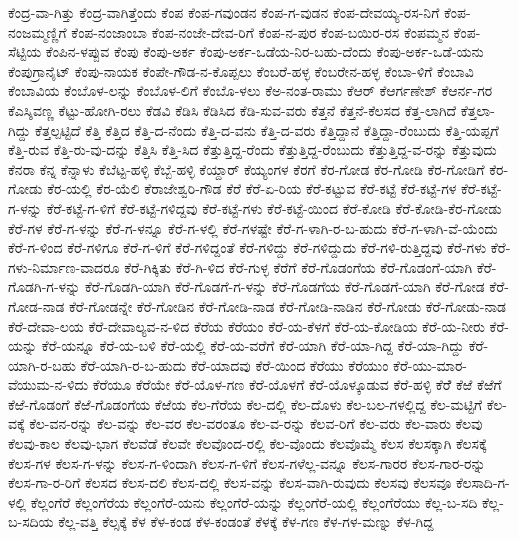 ಕೆಂದ್ರ-ವಾ-ಗಿತ್ತು
ಕೆಂದ್ರ-ವಾಗಿತ್ತೆಂದು
ಕೆಂಪ
ಕೆಂಪ-ಗವುಂಡನ
ಕೆಂಪ-ಗ-ವುಡನ
ಕೆಂಪ-ದೇವಯ್ಯ-ರಸ-ನಿಗೆ
ಕೆಂಪ-ನಂಜಮ್ಮಣ್ಣಿಗೆ
ಕೆಂಪ-ನಂಜಾಂಬಾ
ಕೆಂಪ-ನಂಜೇ-ದೇವ-ರಿಗೆ
ಕೆಂಪ-ನ-ಪುರ
ಕೆಂಪ-ಬಯಿರ-ರಸ
ಕೆಂಪಮ್ಮನ
ಕೆಂಪ-ಸೆಟ್ಟಿಯ
ಕೆಂಪಿನ-ಳಪ್ಪುವ
ಕೆಂಪು
ಕೆಂಪು-ಅರ್ಕ
ಕೆಂಪು-ಅರ್ಕ-ಒಡೆಯ-ನಿರ-ಬಹು-ದೆಂದು
ಕೆಂಪು-ಅರ್ಕ-ಒಡೆ-ಯನು
ಕೆಂಪುಗ್ರಾನೈಟ್
ಕೆಂಪು-ನಾಯಕ
ಕೆಂಪೇ-ಗೌಡ-ನ-ಕೊಪ್ಪಲು
ಕೆಂಬರೆ-ಹಳ್ಳ
ಕೆಂಬರೇನ-ಹಳ್ಳ
ಕೆಂಬಾ-ಳಿಗೆ
ಕೆಂಬಾವಿ
ಕೆಂಬಾವಿಯ
ಕೆಂಬೊಳ-ಲನ್ನು
ಕೆಂಬೊಳ-ಲಿಗೆ
ಕೆಂಬೊ-ಳಲು
ಕೆಅ-ನಂತ-ರಾಮು
ಕೆಆರ್
ಕೆಆರ್ಗಣೇಶ್
ಕೆಆರ್ನ-ಗರ
ಕೆಎಸ್ಶಿವಣ್ಣ
ಕೆಟ್ಟು-ಹೋಗಿ-ರಲು
ಕೆಡವಿ
ಕೆಡಿಸಿ
ಕೆಡಿಸಿದ
ಕೆಡಿ-ಸುವ-ವರು
ಕೆತ್ತನೆ
ಕೆತ್ತನೆ-ಕೆಲಸದ
ಕೆತ್ತ-ಲಾಗಿದೆ
ಕೆತ್ತಲಾ-ಗಿದ್ದು
ಕೆತ್ತಲ್ಪಟ್ಟಿದೆ
ಕೆತ್ತಿ
ಕೆತ್ತಿದ
ಕೆತ್ತಿ-ದ-ನೆಂದು
ಕೆತ್ತಿ-ದ-ವನು
ಕೆತ್ತಿ-ದ-ವರು
ಕೆತ್ತಿದ್ದಾನೆ
ಕೆತ್ತಿದ್ದಾ-ರೆಂಬುದು
ಕೆತ್ತಿ-ಯಪ್ಪಗೆ
ಕೆತ್ತಿ-ರುವ
ಕೆತ್ತಿ-ರು-ವು-ದನ್ನು
ಕೆತ್ತಿಸಿ
ಕೆತ್ತಿ-ಸಿದ
ಕೆತ್ತುತ್ತಿದ್ದ-ರೆಂದು
ಕೆತ್ತುತ್ತಿದ್ದ-ರೆಂಬುದು
ಕೆತ್ತುತ್ತಿದ್ದ-ವ-ರನ್ನು
ಕೆತ್ತುವುದು
ಕೆನರಾ
ಕೆನ್ನ
ಕೆನ್ನಾಳು
ಕೆಬೆಟ್ಟ-ಹಳ್ಳಿ
ಕೆಬ್ಬೆ-ಹಳ್ಳಿ
ಕೆಯ್ದಾರ್
ಕೆಯ್ಯಂಗಳ
ಕೆರಗೆ
ಕೆರ-ಗೋಡ
ಕೆರ-ಗೋಡಿ
ಕೆರ-ಗೋಡಿಗೆ
ಕೆರ-ಗೋಡು
ಕೆರ-ಯಲ್ಲಿ
ಕೆರ-ಯೆಲಿ
ಕೆರಾಜೇಶ್ವರಿ-ಗೌಡ
ಕೆರೆ
ಕೆರೆ-ಏ-ರಿಯ
ಕೆರೆ-ಕಟ್ಟುವ
ಕೆರೆ-ಕಟ್ಟೆ
ಕೆರೆ-ಕಟ್ಟೆ-ಗಳ
ಕೆರೆ-ಕಟ್ಟೆ-ಗ-ಳನ್ನು
ಕೆರೆ-ಕಟ್ಟೆ-ಗ-ಳಿಗೆ
ಕೆರೆ-ಕಟ್ಟೆ-ಗಳಿದ್ದವು
ಕೆರೆ-ಕಟ್ಟೆ-ಗಳು
ಕೆರೆ-ಕಟ್ಟೆ-ಯಿಂದ
ಕೆರೆ-ಕೋಡಿ
ಕೆರೆ-ಕೋಡಿ-ಕೆರ-ಗೋಡು
ಕೆರೆ-ಗಳ
ಕೆರೆ-ಗ-ಳನ್ನು
ಕೆರೆ-ಗ-ಳನ್ನೂ
ಕೆರೆ-ಗ-ಳಲ್ಲಿ
ಕೆರೆ-ಗಳಷ್ಟೇ
ಕೆರೆ-ಗ-ಳಾಗಿ-ರ-ಬ-ಹುದು
ಕೆರೆ-ಗ-ಳಾಗಿ-ವೆ-ಯೆಂದು
ಕೆರೆ-ಗ-ಳಿಂದ
ಕೆರೆ-ಗಳಿಗೂ
ಕೆರೆ-ಗ-ಳಿಗೆ
ಕೆರೆ-ಗಳಿದ್ದಂತೆ
ಕೆರೆ-ಗಳಿದ್ದು
ಕೆರೆ-ಗಳಿದ್ದುದು
ಕೆರೆ-ಗಳಿ-ರುತ್ತಿದ್ದವು
ಕೆರೆ-ಗಳು
ಕೆರೆ-ಗಳು-ನಿರ್ಮಾಣ-ವಾದರೂ
ಕೆರೆ-ಗಿಕ್ಕಿತು
ಕೆರೆ-ಗಿ-ಳಿದ
ಕೆರೆ-ಗುಳ್ಳ
ಕೆರೆಗೆ
ಕೆರೆ-ಗೊಡಂಗೆಯ
ಕೆರೆ-ಗೊಡಂಗೆ-ಯಾಗಿ
ಕೆರೆ-ಗೊಡಗಿ-ಗ-ಳನ್ನು
ಕೆರೆ-ಗೊಡಗಿ-ಯಾಗಿ
ಕೆರೆ-ಗೊಡಗೆ-ಗ-ಳನ್ನು
ಕೆರೆ-ಗೊಡಗೆಯ
ಕೆರೆ-ಗೊಡಗೆ-ಯಾಗಿ
ಕೆರೆ-ಗೋಡ
ಕೆರೆ-ಗೋಡ-ನಾಡ
ಕೆರೆ-ಗೋಡನ್ನೇ
ಕೆರೆ-ಗೋಡಿನ
ಕೆರೆ-ಗೋಡಿ-ನಾಡ
ಕೆರೆ-ಗೋಡಿ-ನಾಡಿನ
ಕೆರೆ-ಗೋಡು
ಕೆರೆ-ಗೋಡು-ನಾಡ
ಕೆರೆ-ದೇವಾ-ಲಯ
ಕೆರೆ-ದೇವಾಲ್ಯವ-ನ-ಳಿದ
ಕೆರೆಯ
ಕೆರೆಯಂ
ಕೆರೆ-ಯ-ಕೆಳಗೆ
ಕೆರೆ-ಯ-ಕೋಡಿಯ
ಕೆರೆ-ಯ-ನೀರು
ಕೆರೆ-ಯನ್ನು
ಕೆರೆ-ಯನ್ನೂ
ಕೆರೆ-ಯ-ಬಳಿ
ಕೆರೆ-ಯಲ್ಲಿ
ಕೆರೆ-ಯ-ವರೆಗೆ
ಕೆರೆ-ಯಾಗಿ
ಕೆರೆ-ಯಾ-ಗಿದ್ದ
ಕೆರೆ-ಯಾ-ಗಿದ್ದು
ಕೆರೆ-ಯಾಗಿ-ರ-ಬಹು
ಕೆರೆ-ಯಾಗಿ-ರ-ಬ-ಹುದು
ಕೆರೆ-ಯಾದವು
ಕೆರೆ-ಯಿಂದ
ಕೆರೆಯು
ಕೆರೆಯುಂ
ಕೆರೆ-ಯು-ಮಾರ-ವೆಯುಮ-ನ-ಳಿದು
ಕೆರೆಯೂ
ಕೆರೆಯೇ
ಕೆರೆ-ಯೊಳ-ಗಣ
ಕೆರೆ-ಯೊಳಗೆ
ಕೆರೆ-ಯೊಳ್ಕೂಡುವ
ಕೆರೆ-ಹಳ್ಳಿ
ಕೆರೆೆ
ಕೆಱೆ
ಕೆಱೆಗೆ
ಕೆಱೆ-ಗೊಡಂಗೆ
ಕೆಱೆ-ಗೊಡಂಗೆಯ
ಕೆಱೆಯ
ಕೆಲ-ಗೆರೆಯ
ಕೆಲ-ದಲ್ಲಿ
ಕೆಲ-ದೊಳು
ಕೆಲ-ಬಲ-ಗಳಲ್ಲಿದ್ದ
ಕೆಲ-ಮಟ್ಟಿಗೆ
ಕೆಲ-ವಕ್ಕೆ
ಕೆಲ-ವನ-ರನ್ನು
ಕೆಲ-ವನ್ನು
ಕೆಲ-ವರ
ಕೆಲ-ವರಂತೂ
ಕೆಲ-ವ-ರನ್ನು
ಕೆಲವ-ರಿಗೆ
ಕೆಲ-ವರು
ಕೆಲ-ವಾರು
ಕೆಲವು
ಕೆಲವು-ಕಾಲ
ಕೆಲವು-ಭಾಗ
ಕೆಲವೆಡೆ
ಕೆಲವೇ
ಕೆಲವೊಂದ-ರಲ್ಲಿ
ಕೆಲ-ವೊಂದು
ಕೆಲವೊಮ್ಮೆ
ಕೆಲಸ
ಕೆಲಸಕ್ಕಾಗಿ
ಕೆಲಸಕ್ಕೆ
ಕೆಲಸ-ಗಳ
ಕೆಲಸ-ಗ-ಳನ್ನು
ಕೆಲಸ-ಗ-ಳಿಂದಾಗಿ
ಕೆಲಸ-ಗ-ಳಿಗೆ
ಕೆಲಸ-ಗಳೆಲ್ಲ-ವನ್ನೂ
ಕೆಲಸ-ಗಾರರ
ಕೆಲಸ-ಗಾರ-ರನ್ನು
ಕೆಲಸ-ಗಾ-ರ-ರಿಗೆ
ಕೆಲಸದ
ಕೆಲಸ-ದಲಿ
ಕೆಲಸ-ದಲ್ಲಿ
ಕೆಲಸ-ವನ್ನು
ಕೆಲಸ-ವಾಗಿ-ರುವುದು
ಕೆಲಸವು
ಕೆಲಸವೂ
ಕೆಲಸಾದಿ-ಗ-ಳಲ್ಲಿ
ಕೆಲ್ಲಂಗೆರೆ
ಕೆಲ್ಲಂಗೆರೆಯ
ಕೆಲ್ಲಂಗೆರೆ-ಯನು
ಕೆಲ್ಲಂಗೆರೆ-ಯನ್ನು
ಕೆಲ್ಲಂಗೆರೆ-ಯಲ್ಲಿ
ಕೆಲ್ಲಂಗೆರೆಯು
ಕೆಲ್ಲ-ಬ-ಸದಿ
ಕೆಲ್ಲ-ಬ-ಸದಿಯ
ಕೆಲ್ಲ-ವತ್ತಿ
ಕೆಲ್ಸಕ್ಕೆ
ಕೆಳ
ಕೆಳ-ಕಂಡ
ಕೆಳ-ಕಂಡಂತೆ
ಕೆಳಕ್ಕೆ
ಕೆಳ-ಗಣ
ಕೆಳ-ಗಳ-ಮಣ್ನು
ಕೆಳ-ಗಿದ್ದ
